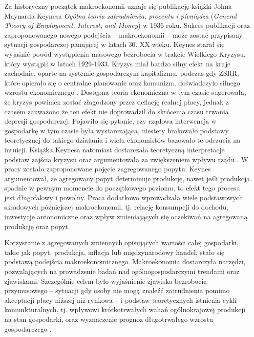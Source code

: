 Za historyczny początek makroekonomii uznaje się publikację książki Johna Maynarda Keynesa \emph{Ogólna teoria zatrudnienia, procentu i pieniądza} (\emph{General Theory of Employment, Interest, and Money}) w 1936 roku. Sukces publikacji oraz zaproponowanego nowego podejścia -- makroekonomii -- może zostać przypisany sytuacji gospodarczej panującej w latach 30. XX wieku. Keynes starał się wyjaśnić powód wystąpienia masowego bezrobocia w trakcie Wielkiego Kryzysu, który wystąpił w latach 1929-1933. Kryzys miał bardzo silny efekt na kraje zachodnie, oparte na systemie gospodarczym kapitalizmu, podczas gdy ZSRR, które opierało się o centralne planowanie oraz komunizm, doświadczyło silnego wzrostu ekonomicznego \cite{deVroey}. Dostępna teoria ekonomiczna w tym czasie sugerowała, że kryzys powinien zostać złagodzony przez deflację realnej płacy, jednak z czasem zauważono że ten efekt nie doprowadził do skrócenia czasu trwania depresji gospodarczej. Pojawiło się pytanie, czy rządowa interwencja w gospodarkę w tym czasie była wystarczająca, niestety brakowało podstawy teoretycznej do takiego działania i wielu ekonomistów bazowało te odczucia na intuicji. Książka Keynesa natomiast dostarczała teoretyczną interpretacje podstaw zajścia kryzysu oraz argumentowała za zwiększeniem wpływu rządu \cite{blanchard-macroeconomics}. W pracy zostało zaproponowane pojęcie zagregowanego popytu. Keynes argumentował, że agregowany popyt determinuje produkcję, nawet jeśli produkcja spadnie w pewnym momencie do początkowego poziomu, to efekt tego procesu jest długofalowy i powolny. Praca dodatkowo wprowadzała wiele podstawowych składowych późniejszej makroekonomii, tj. relację konsumpcji do dochodu, inwestycje autonomiczne oraz wpływ zmieniających się oczekiwań na agregowaną produkcję oraz popyt.

Korzystanie z agregowanych zmiennych opisujących wartości całej gospodarki, takie jak popyt, produkcja, inflacja lub międzynarodowy handel, stało się podstawą podejścia makroekonomicznego. Makroekonomia dostarczyła narzędzi, pozwalających na prowadzenie badań nad ogólnogospodarczymi trendami oraz zjawiskami. Szczególnie celem było wyjaśnienie zjawiska bezrobocia przymusowego -- sytuacji gdy osoby nie mogą znaleźć zatrudnienia pomimo akceptacji płacy niższej niż rynkowa \cite{deVroey} -- i podstaw teoretycznych istnienia cykli koniunkturalnych, tj. wpływowi krótkotrwałych wahań ogólnokrajowej produkcji na stan gospodarki, oraz wyznaczenie prognoz długotrwałego wzrostu gospodarczego \cite{modern_macroeconomics}. 


